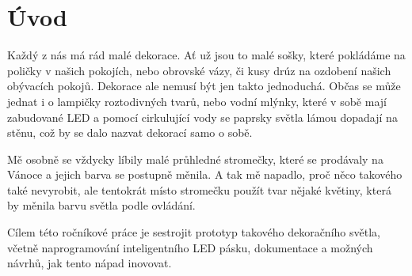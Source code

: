 \chapter*{Úvod}

Každý z nás má rád malé dekorace. Ať už jsou to malé sošky, které pokládáme na poličky v našich pokojích, nebo obrovské vázy, či kusy drúz na ozdobení našich obývacích pokojů. Dekorace ale nemusí být jen takto jednoduchá. Občas se může jednat i o lampičky roztodivných tvarů, nebo vodní mlýnky, které v sobě mají zabudované LED a pomocí cirkulující vody se paprsky světla lámou dopadají na stěnu, což by se dalo nazvat dekorací samo o sobě.

Mě osobně se vždycky líbily malé průhledné stromečky, které se prodávaly na Vánoce a jejich barva se postupně měnila. A tak mě napadlo, proč něco takového také nevyrobit, ale tentokrát místo stromečku použít tvar nějaké květiny, která by měnila barvu světla podle ovládání. %


Cílem této ročníkové práce je sestrojit prototyp takového dekoračního světla, včetně naprogramování inteligentního LED pásku, dokumentace a možných návrhů, jak tento nápad inovovat.




\newpage